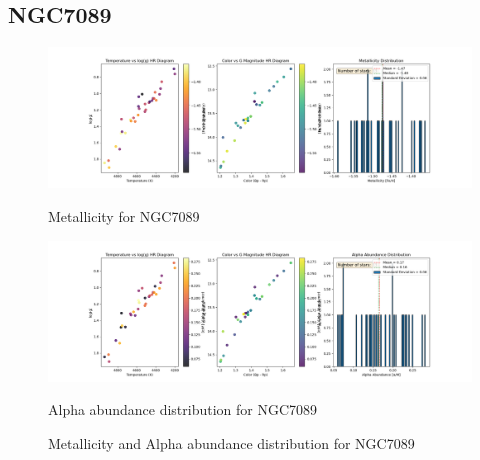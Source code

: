 \documentclass[a4paper,12pt]{article}
\begin{document}
\subsection{NGC7089}
\begin{figure}[H]
    \centering
    \begin{minipage}[b]{0.8\textwidth}
        \centering
        \includegraphics[width=\textwidth]{NGC7089_metalicity.png}
        \caption{Metallicity for NGC7089}
        \label{fig:NGC7089_metalicity}
    \end{minipage}
    \hfill
    \begin{minipage}[b]{0.8\textwidth}
        \centering
        \includegraphics[width=\textwidth]{NGC7089_alpha.png}
        \caption{Alpha abundance distribution for NGC7089}
        \label{fig:NGC7089_alpha}
    \end{minipage}
    \caption{Metallicity and Alpha abundance distribution for NGC7089}
    \label{fig:NGC7089_combined}
\end{figure}
\clearpage














\end{document}
